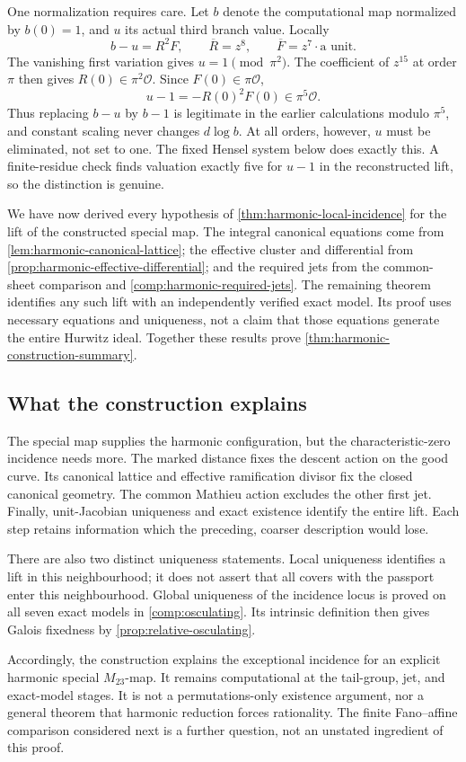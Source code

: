 One normalization requires care.  Let $b$ denote the computational
map normalized by $b(0)=1$, and $u$ its actual third branch value.
Locally
\[
 b-u=R^2F,\qquad \overline R=z^8,\qquad
 \overline F=z^7\cdot\text{a unit}.
\]
The vanishing first variation gives $u=1\pmod{\pi^2}$.
The coefficient of $z^{15}$ at order $\pi$ then gives
$R(0)\in\pi^2\mathcal O$.  Since $F(0)\in\pi\mathcal O$,
\begin{equation}
 u-1=-R(0)^2F(0)\in\pi^5\mathcal O.
\label{eq:harmonic-branch-scalar}
\end{equation}
Thus replacing $b-u$ by $b-1$ is legitimate in the earlier calculations
modulo $\pi^5$, and constant scaling never changes $d\log b$.
At all orders, however, $u$ must be eliminated, not set to one.
The fixed Hensel system below does exactly this.  A finite-residue
check finds valuation exactly five for $u-1$ in the reconstructed
lift, so the distinction is genuine.

We have now derived every hypothesis of
\cref{thm:harmonic-local-incidence} for the lift of the constructed
special map.  The integral canonical equations come from
\cref{lem:harmonic-canonical-lattice}; the effective cluster and
differential from \cref{prop:harmonic-effective-differential}; and
the required jets from the common-sheet comparison and
\cref{comp:harmonic-required-jets}.
The remaining theorem identifies any such lift with an independently
verified exact model.  Its proof uses necessary equations and
uniqueness, not a claim that those equations generate the entire
Hurwitz ideal.  Together these results prove
\cref{thm:harmonic-construction-summary}.



\subsection{What the construction explains}

The special map supplies the harmonic configuration, but the
characteristic-zero incidence needs more.  The marked distance fixes
the descent action on the good curve.  Its canonical lattice and
effective ramification divisor fix the closed canonical geometry.
The common Mathieu action excludes the other first jet.  Finally,
unit-Jacobian uniqueness and exact existence identify the entire
lift.  Each step retains information which the preceding, coarser
description would lose.

There are also two distinct uniqueness statements.  Local uniqueness
identifies a lift in this neighbourhood; it does not assert that
all covers with the passport enter this neighbourhood.  Global
uniqueness of the incidence locus is proved on all seven exact
models in \cref{comp:osculating}.  Its intrinsic definition then
gives Galois fixedness by \cref{prop:relative-osculating}.

Accordingly, the construction explains the exceptional incidence for
an explicit harmonic special $M_{23}$-map.  It remains computational
at the tail-group, jet, and exact-model stages.  It is not a
permutations-only existence argument, nor a general theorem that
harmonic reduction forces rationality.  The finite Fano--affine
comparison considered next is a further question, not an unstated
ingredient of this proof.
